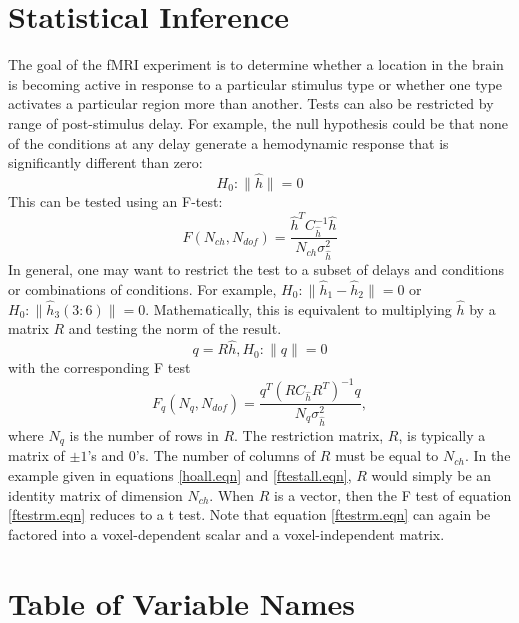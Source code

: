 \documentclass[12pt]{article}
\begin{document}
\section{Statistical Inference}

The goal of the fMRI experiment is to determine whether a location in
the brain is becoming active in response to a particular stimulus type
or whether one type activates a particular region more than another.
Tests can also be restricted by range of post-stimulus delay.  For
example, the null hypothesis could be that none of the conditions at
any delay generate a hemodynamic response that is significantly
different than zero:
\begin{equation}
H_0: \| \hat{h} \| = 0
\label{hoall.eqn}
\end{equation}
This can be tested using an F-test:
\begin{equation}
F(N_{ch}, N_{dof}) = \frac{\hat{h}^T C_{\hat{h}}^{-1}\hat{h}}
                          { N_{ch} \sigma^2_{\hat{h}}}
\label{ftestall.eqn}
\end{equation}
In general, one may want to restrict the test to a subset of delays
and conditions or combinations of conditions.  For example,
$H_0: \| \hat{h}_1 - \hat{h}_2 \| = 0$ or 
$H_0: \| \hat{h}_3(3:6) \| = 0$.  Mathematically, this is equivalent
to multiplying $\hat{h}$ by a matrix $R$ and testing the norm of the
result.  
\begin{equation}
q = R \hat{h}, H_0: \| q \| = 0
\end{equation}
with the corresponding F test
\begin{equation}
F_q(N_{q}, N_{dof}) = \frac{q^T (R C_{\hat{h}} R^T)^{-1} q}
{N_{q} \sigma^2_{\hat{h}}},
\label{ftestrm.eqn}
\end{equation} 
where $N_q$ is the number of rows in $R$. The restriction matrix, $R$,
is typically a matrix of $\pm 1$'s and 0's.  The number of columns of
$R$ must be equal to $N_{ch}$.  In the example given in equations
\ref{hoall.eqn} and \ref{ftestall.eqn}, $R$ would simply be an
identity matrix of dimension $N_{ch}$.  When $R$ is a vector, then the
F test of equation \ref{ftestrm.eqn} reduces to a t test.  Note that
equation \ref{ftestrm.eqn} can again be factored into a
voxel-dependent scalar and a voxel-independent matrix.


\section{Table of Variable Names}
\end{document}

